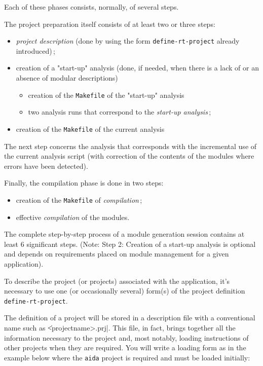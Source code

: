 Each of these phases consists, normally, of several steps.

The project preparation itself consists of at least two or three steps:
\begin{itemize}
\item {\em project description} (done by using the form
{\tt define-rt-project} already introduced)\,;
\item creation of a "start-up" analysis (done, if needed, when there is a lack of or an absence of modular descriptions) 
\begin{itemize}
\item creation of the {\tt Makefile} of the "start-up" analysis 
\item two analysis runs that correspond to the 
{\em start-up analysis}\,;
\end{itemize}
\item creation of the {\tt Makefile} of the current analysis
\end{itemize}

The next step concerns the analysis that corresponds with the incremental use of the current analysis script (with correction of the contents of the modules where errors have been detected). 

Finally, the compilation phase is done in two steps:
\begin{itemize}
\item creation of the {\tt Makefile} of {\em compilation}\,;
\item effective {\em compilation} of the modules. 
\end{itemize}

The complete step-by-step process of a module generation session contains at least 6 significant steps.  (Note:  Step 2:  Creation of a start-up analysis is optional and depends on requirements placed on module management for a given application).  


To describe the project (or projects) associated with the application, it's necessary to use one (or occasionally several) form(s) of the project definition {\tt define-rt-project}.

The definition of a project will be stored in a description file with a conventional name such as  \|<projectname>.prj|.  This file, in fact, brings together all the information necessary to the project and, most notably, loading instructions of other projects when they are required.  You will write a loading form as in the example below where the {\tt aida} project is required and must be loaded initially:   

